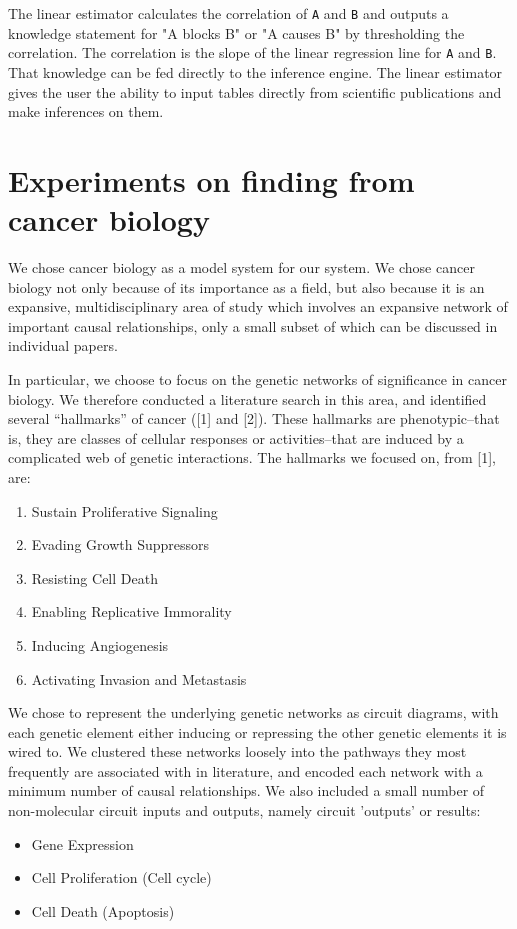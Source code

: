 \documentclass[11pt]{article}
\begin{document}
The linear estimator calculates the correlation of \texttt{A} and \texttt{B} and outputs a knowledge statement for "A blocks B" or "A causes B" by thresholding the correlation. The correlation is the slope of the linear regression line for \texttt{A} and \texttt{B}. That knowledge can be fed directly to the inference engine. The linear estimator gives the user the ability to input tables directly from scientific publications and make inferences on them.
\section{Experiments on finding from cancer biology}
\label{sec-3}

We chose cancer biology as a model system for our system. We chose cancer biology not only because of its importance as a field, but also because it is an expansive, multidisciplinary area of study which involves an expansive network of important causal relationships, only a small subset of which can be discussed in individual papers.

In particular, we choose to focus on the genetic networks of
significance in cancer biology. We therefore conducted a literature
search in this area, and identified several “hallmarks” of cancer ([1]
and [2]). These hallmarks are phenotypic--that is, they are classes of cellular responses or activities--that are induced by a complicated web of genetic interactions. The hallmarks we focused on, from [1], are:

\begin{enumerate}
\item Sustain Proliferative Signaling
\item Evading Growth Suppressors
\item Resisting Cell Death
\item Enabling Replicative Immorality
\item Inducing Angiogenesis
\item Activating Invasion and Metastasis
\end{enumerate}

We chose to represent the underlying genetic networks as circuit diagrams, with each genetic element either inducing or repressing the other genetic elements it is wired to. We clustered these networks loosely into the pathways they most frequently are associated with in literature, and encoded each network with a minimum number of causal relationships. We also included a small number of non-molecular circuit inputs and outputs, namely circuit 'outputs' or results:
\begin{itemize}
\item Gene Expression
\item Cell Proliferation (Cell cycle)
\item Cell Death (Apoptosis)
\end{itemize}
\end{document}
